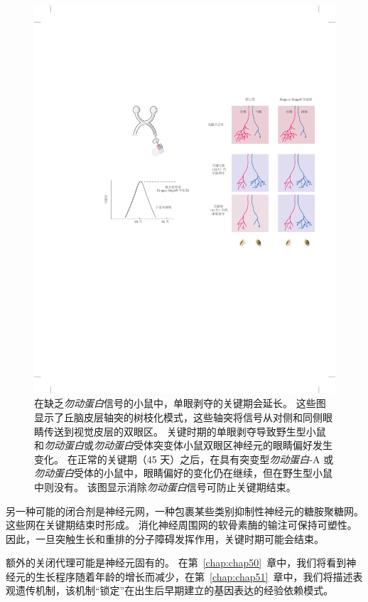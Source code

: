 \begin{figure}[htbp]
	\centering
	\includegraphics[width=1.0\linewidth]{chap49/fig_49_12}
	\caption{在缺乏\textit{勿动蛋白}信号的小鼠中，单眼剥夺的关键期会延长。
		这些图显示了丘脑皮层轴突的树枝化模式，这些轴突将信号从对侧和同侧眼睛传送到视觉皮层的双眼区。
		关键时期的单眼剥夺导致野生型小鼠和\textit{勿动蛋白}或\textit{勿动蛋白}受体突变体小鼠双眼区神经元的眼睛偏好发生变化。
		在正常的关键期（45 天）之后，在具有突变型\textit{勿动蛋白}-A 或\textit{勿动蛋白}受体的小鼠中，眼睛偏好的变化仍在继续，但在野生型小鼠中则没有。
		该图显示消除\textit{勿动蛋白}信号可防止关键期结束\cite{mcgee2005experience}。}
	\label{fig:49_12}
\end{figure}


另一种可能的闭合剂是神经元网，一种包裹某些类别抑制性神经元的糖胺聚糖网。
这些网在关键期结束时形成。
消化神经周围网的软骨素酶的输注可保持可塑性。
因此，一旦突触生长和重排的分子障碍发挥作用，关键时期可能会结束。


额外的关闭代理可能是神经元固有的。
在第~\ref{chap:chap50}~章中，我们将看到神经元的生长程序随着年龄的增长而减少，在第~\ref{chap:chap51}~章中，我们将描述表观遗传机制，该机制“锁定”在出生后早期建立的基因表达的经验依赖模式。


